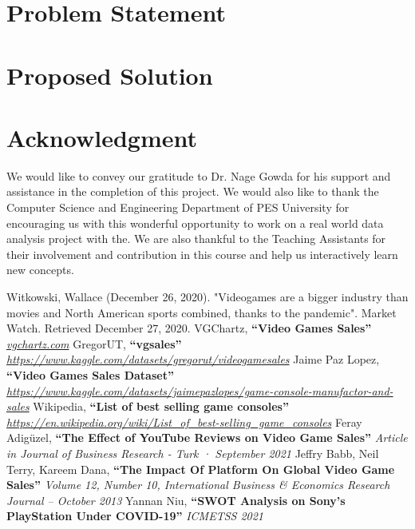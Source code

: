 \documentclass[conference]{IEEEtran}
\begin{document}
\section{Problem Statement}

\section{Proposed Solution}


\section{Acknowledgment}
We would like to convey our gratitude to Dr. Nage Gowda for his support and assistance in the completion of this project. We would also like to thank the Computer Science and Engineering Department of PES University for encouraging us with this wonderful opportunity to work on a real world data analysis project with the. We are also thankful to the Teaching Assistants for their involvement and contribution in this course and help us interactively learn new concepts.

\begin{thebibliography}{00}
     Witkowski, Wallace (December 26, 2020). "Videogames are a bigger industry than movies and North American sports combined, thanks to the pandemic". Market Watch. Retrieved December 27, 2020.
     VGChartz, \textbf{``Video Games Sales''} \textit{\url{vgchartz.com}}
     GregorUT, \textbf{``vgsales''} \textit{\url{https://www.kaggle.com/datasets/gregorut/videogamesales}}
     Jaime Paz Lopez, \textbf{``Video Games Sales Dataset''} \textit{\url{https://www.kaggle.com/datasets/jaimepazlopes/game-console-manufactor-and-sales}}
     Wikipedia, \textbf{``List of best selling game consoles''} \textit{\url{https://en.wikipedia.org/wiki/List_of_best-selling_game_consoles}}
     Feray Adigüzel, \textbf{``The Effect of YouTube Reviews on Video Game Sales''} \textit{Article  in  Journal of Business Research - Turk · September 2021}
     Jeffry Babb, Neil Terry, Kareem Dana, \textbf{``The Impact Of Platform On Global Video Game Sales''} \textit{Volume 12, Number 10, International Business \& Economics Research Journal – October 2013}
     Yannan Niu, \textbf{``SWOT Analysis on Sony's PlayStation Under COVID-19''} \textit{ICMETSS 2021}

\end{thebibliography}
\end{document}

